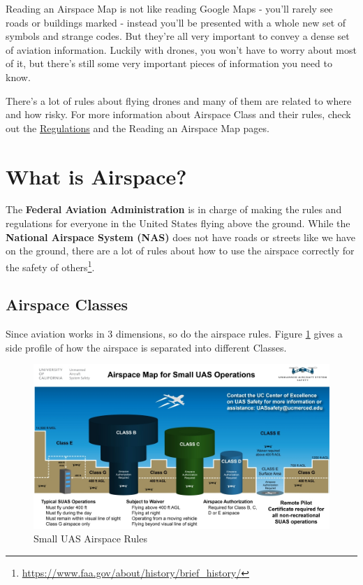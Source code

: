 \documentclass[
  12pt,
]{book}
\newenvironment{notebox}{
  \definecolor{shadecolor}{gray}{.8}  %
  \color{black}
  \begin{shaded}}
 {\end{shaded}}
\begin{document}
Reading an Airspace Map is not like reading Google Maps - you'll rarely see roads or buildings marked - instead you'll be presented with a whole new set of symbols and strange codes. But they're all very important to convey a dense set of aviation information. Luckily with drones, you won't have to worry about most of it, but there's still some very important pieces of information you need to know.

\begin{notebox}
There's a lot of rules about flying drones and many of them are related to where and how risky. For more information about Airspace Class and their rules, check out the \protect\hyperlink{regulations}{Regulations} and the Reading an Airspace Map pages.

\end{notebox}

\hypertarget{what-is-airspace}{%
\section{What is Airspace?}\label{what-is-airspace}}

The \textbf{Federal Aviation Administration} is in charge of making the rules and regulations for everyone in the United States flying above the ground. While the \textbf{National Airspace System (NAS)} does not have roads or streets like we have on the ground, there are a lot of rules about how to use the airspace correctly for the safety of others\footnote{\url{https://www.faa.gov/about/history/brief_history/}}.

\hypertarget{airspace-classes}{%
\subsection{Airspace Classes}\label{airspace-classes}}

Since aviation works in 3 dimensions, so do the airspace rules. Figure \ref{fig:SUAS-airspace-airspace} gives a side profile of how the airspace is separated into different Classes.

\begin{figure}

{\centering \includegraphics[width=0.9\linewidth]{images/SUAS_airspace_map} 

}

\caption{Small UAS Airspace Rules}\label{fig:SUAS-airspace-airspace}
\end{figure}
\end{document}
